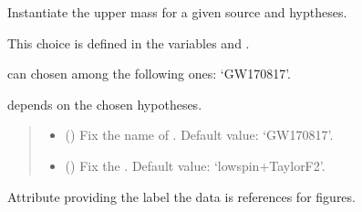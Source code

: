\documentclass[letterpaper,10pt,english]{sphinxmanual}
\begin{document}
\begin{fulllineitems}
\label{\detokenize{source/api/setup_astro_mup:nucleardatapy.setup_astro_mup.SetupAstroMup}}
\pysigstartsignatures
\pysiglinewithargsret
{}
{\sphinxparamcomma {}}
{}
\pysigstopsignatures
\sphinxAtStartPar
Instantiate the upper mass for a given source and hyptheses.

\sphinxAtStartPar
This choice is defined in the variables  and .

\sphinxAtStartPar
{} can chosen among the following ones: ‘GW170817’.

\sphinxAtStartPar
{} depends on the chosen hypotheses.
\begin{quote}\begin{description}
\begin{itemize}
\item {} 
\sphinxAtStartPar
{} (\sphinxstyleliteralemphasis{\sphinxupquote{, }}) \textendash{} Fix the name of . Default value: ‘GW170817’.

\item {} 
\sphinxAtStartPar
{} (\sphinxstyleliteralemphasis{\sphinxupquote{, }}) \textendash{} Fix the . Default value: ‘low\sphinxhyphen{}spin+TaylorF2’.

\end{itemize}

\end{description}\end{quote}

\sphinxAtStartPar
{}

\begin{fulllineitems}
\label{\detokenize{source/api/setup_astro_mup:nucleardatapy.setup_astro_mup.SetupAstroMup.label}}
\pysigstartsignatures
\pysigline
{}
\pysigstopsignatures
\sphinxAtStartPar
Attribute providing the label the data is references for figures.


\end{fulllineitems}
\end{fulllineitems}
\end{document}
